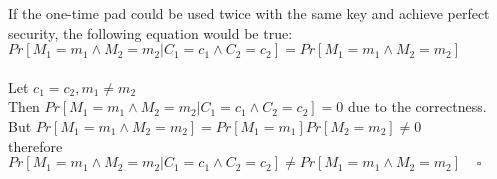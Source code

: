 If the one-time pad could be used twice with the same key and achieve perfect security, the following equation would be true: \\
$Pr[M_{1} = m_{1} \wedge M_{2} = m_{2} | C_{1} = c_{1} \wedge  C_{2} = c_{2}] = Pr[M_{1} = m_{1} \wedge  M_{2} = m_{2}]$ \\
\\
Let $c_{1} = c_{2}, m_{1} \neq m_{2}$ \\
Then $Pr[M_{1} = m_{1} \wedge  M_{2} = m_{2} |  C_{1} = c_{1} \wedge  C_{2} = c_{2}] = 0$ due to the correctness.\\
But $Pr[M_{1} = m_{1} \wedge  M_{2} = m_{2}] = Pr[M_{1} = m_{1}] Pr[M_{2} = m_{2}] \neq  0$\\
therefore\\
$Pr[M_{1} = m_{1} \wedge M_{2} = m_{2} | C_{1} = c_{1} \wedge  C_{2} = c_{2}] \neq Pr[M_{1} = m_{1} \wedge  M_{2} = m_{2}] \;\;\;\; \square$

